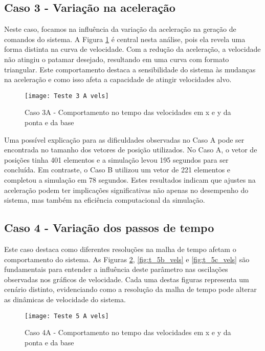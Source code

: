 \subsection{Caso 3 - Variação na aceleração}
Neste caso, focamos na influência da variação da aceleração na geração de comandos do sistema. A Figura \ref{fig:t_3a_vels} é central nesta análise, pois ela revela uma forma distinta na curva de velocidade. Com a redução da aceleração, a velocidade não atingiu o patamar desejado, resultando em uma curva com formato triangular. Este comportamento destaca a sensibilidade do sistema às mudanças na aceleração e como isso afeta a capacidade de atingir velocidades alvo.

\begin{figure}[H]
    \begin{center}
    \caption{Caso 3A - Comportamento no tempo das velocidades em x e y da ponta e da base}
    \texttt{[image: Teste 3 A vels]}
    \label{fig:t_3a_vels}
    \end{center}
\end{figure}

Uma possível explicação para as dificuldades observadas no Caso A pode ser encontrada no tamanho dos vetores de posição utilizados. No Caso A, o vetor de posições tinha 401 elementos e a simulação levou 195 segundos para ser concluída. Em contraste, o Caso B utilizou um vetor de 221 elementos e completou a simulação em 78 segundos. Estes resultados indicam que ajustes na aceleração podem ter implicações significativas não apenas no desempenho do sistema, mas também na eficiência computacional da simulação.

\subsection{Caso 4 - Variação dos passos de tempo}
Este caso destaca como diferentes resoluções na malha de tempo afetam o comportamento do sistema. As Figuras \ref{fig:t_5a_vels}, \ref{fig:t_5b_vels} e \ref{fig:t_5c_vels} são fundamentais para entender a influência deste parâmetro nas oscilações observadas nos gráficos de velocidade. Cada uma destas figuras representa um cenário distinto, evidenciando como a resolução da malha de tempo pode alterar as dinâmicas de velocidade do sistema.

\begin{figure}[H]
    \begin{center}
    \caption{Caso 4A - Comportamento no tempo das velocidades em x e y da ponta e da base}
    \texttt{[image: Teste 5 A vels]}
    \label{fig:t_5a_vels}
    \end{center}
\end{figure}

